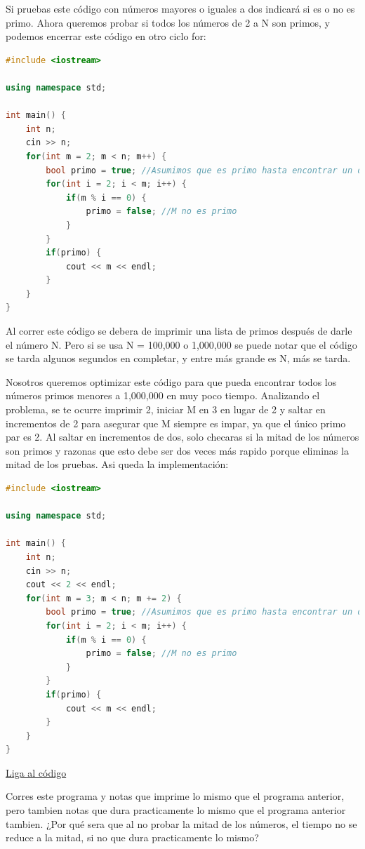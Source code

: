 \documentclass{article}
\begin{document}
Si pruebas este código con números mayores o iguales a dos indicará si es o no es primo. Ahora queremos probar si todos los números de 2 a N son primos, y podemos encerrar este código en otro ciclo for:

\begin{lstlisting}[language=C++, caption=Encontrando primos menores que N]
#include <iostream>

using namespace std;

int main() {
    int n;
    cin >> n;
    for(int m = 2; m < n; m++) {
        bool primo = true; //Asumimos que es primo hasta encontrar un divisor
        for(int i = 2; i < m; i++) {
            if(m % i == 0) {
                primo = false; //M no es primo
            }
        }
        if(primo) {
            cout << m << endl;
        }
    }
}
\end{lstlisting}

Al correr este código se debera de imprimir una lista de primos después de darle el número N. Pero si se usa N = 100,000 o 1,000,000 se puede notar que el código se tarda algunos segundos en completar, y entre más grande es N, más se tarda.

Nosotros queremos optimizar este código para que pueda encontrar todos los números primos menores a 1,000,000 en muy poco tiempo. Analizando el problema, se te ocurre imprimir 2, iniciar M en 3 en lugar de 2 y saltar en incrementos de 2 para asegurar que M siempre es impar, ya que el único primo par es 2. Al saltar en incrementos de dos, solo checaras si la mitad de los números son primos y razonas que esto debe ser dos veces más rapido porque eliminas la mitad de los pruebas. Asi queda la implementación:

\begin{lstlisting}[language=C++, caption=¿Optimizando?]
#include <iostream>

using namespace std;

int main() {
    int n;
    cin >> n;
    cout << 2 << endl;
    for(int m = 3; m < n; m += 2) {
        bool primo = true; //Asumimos que es primo hasta encontrar un divisor
        for(int i = 2; i < m; i++) {
            if(m % i == 0) {
                primo = false; //M no es primo
            }
        }
        if(primo) {
            cout << m << endl;
        }
    }
}
\end{lstlisting}
\href{https://repl.it/@Jamesscn/Programa-ineficiente}{Liga al código}

Corres este programa y notas que imprime lo mismo que el programa anterior, pero tambien notas que dura practicamente lo mismo que el programa anterior tambien. ¿Por qué sera que al no probar la mitad de los números, el tiempo no se reduce a la mitad, si no que dura practicamente lo mismo?
\end{document}
